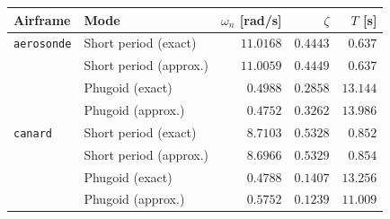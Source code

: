 \begin{tabular}{llrrr}
\toprule
Airframe & Mode & $\omega_n$ [rad/s] & $\zeta$ & $T$ [s] \\
\midrule
\texttt{aerosonde} & Short period (exact) & $11.0168$ & $0.4443$ & $0.637$ \\
 & Short period (approx.) & $11.0059$ & $0.4449$ & $0.637$ \\
 & Phugoid (exact) & $0.4988$ & $0.2858$ & $13.144$ \\
 & Phugoid (approx.) & $0.4752$ & $0.3262$ & $13.986$ \\
\midrule
\texttt{canard} & Short period (exact) & $8.7103$ & $0.5328$ & $0.852$ \\
 & Short period (approx.) & $8.6966$ & $0.5329$ & $0.854$ \\
 & Phugoid (exact) & $0.4788$ & $0.1407$ & $13.256$ \\
 & Phugoid (approx.) & $0.5752$ & $0.1239$ & $11.009$ \\
\bottomrule
\end{tabular}
